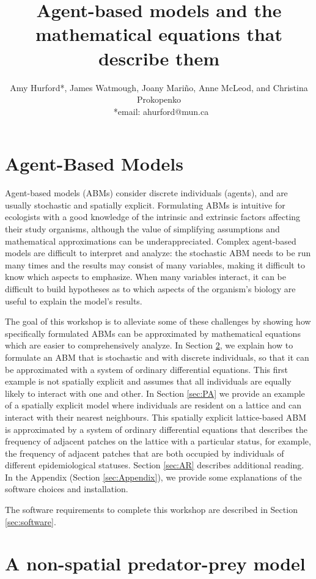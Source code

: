\documentclass[11pt, oneside]{article}   	%
\title{
\textbf{Agent-based models and the mathematical equations that describe them}}
\author{Amy Hurford*, James Watmough, Joany Mari\~{n}o, Anne McLeod, and Christina Prokopenko \\
\ *email: ahurford@mun.ca}
\date{}
\begin{document}
\maketitle
\tableofcontents

\newpage
\section{Agent-Based Models}
Agent-based models (ABMs) consider discrete individuals (agents), and are usually stochastic and spatially explicit. Formulating ABMs is intuitive for ecologists with a good knowledge of the intrinsic and extrinsic factors affecting their study organisms, although the value of simplifying assumptions and mathematical approximations can be underappreciated. Complex agent-based models are difficult to interpret and analyze: the stochastic ABM needs to be run many times and the results may consist of many variables, making it difficult to know which aspects to emphasize. When many variables interact, it can be difficult to build hypotheses as to which aspects of the organism's biology are useful to explain the model's results.

The goal of this workshop is to alleviate some of these challenges by showing how specifically formulated ABMs can be approximated by mathematical equations which are easier to comprehensively analyze. In Section \ref{sec:SSA}, we explain how to formulate an ABM that is stochastic and with discrete individuals, so that it can be approximated with a system of ordinary differential equations. This first example is not spatially explicit and assumes that all individuals are equally likely to interact with one and other. In Section \ref{sec:PA} we provide an example of a spatially explicit model where individuals are resident on a lattice and can interact with their nearest neighbours. This spatially explicit lattice-based ABM is approximated by a system of ordinary differential equations that describes the frequency of adjacent patches on the lattice with a particular status, for example, the frequency of adjacent patches that are both occupied by individuals of different epidemiological statuses. Section \ref{sec:AR} describes additional reading. In the Appendix (Section \ref{sec:Appendix}), we provide some explanations of the software choices and installation.

The software requirements to complete this workshop are described in Section \ref{sec:software}.

\section{A non-spatial predator-prey model}\label{sec:SSA}
\end{document}
